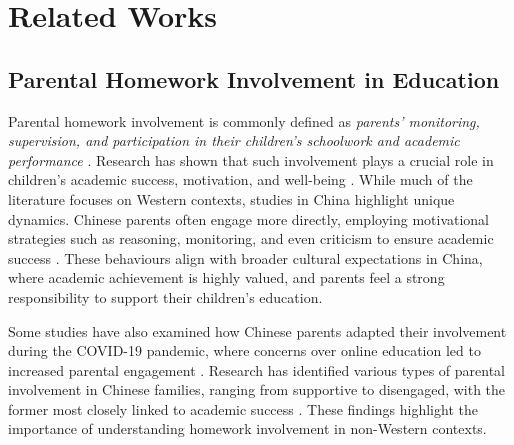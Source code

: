 \section{Related Works}

\subsection{Parental Homework Involvement in Education}

Parental homework involvement is commonly defined as \textit{parents' monitoring, supervision, and participation in their children's schoolwork and academic performance} \cite{pomerantz2007whom}. Research has shown that such involvement plays a crucial role in children's academic success, motivation, and well-being \cite{patall2008parent, dettmers2019antecedents, cooper1989synthesis}. While much of the literature focuses on Western contexts, studies in China highlight unique dynamics. Chinese parents often engage more directly, employing motivational strategies such as reasoning, monitoring, and even criticism to ensure academic success \cite{kim2013parents}. These behaviours align with broader cultural expectations in China, where academic achievement is highly valued, and parents feel a strong responsibility to support their children's education.

Some studies have also examined how Chinese parents adapted their involvement during the COVID-19 pandemic, where concerns over online education led to increased parental engagement \cite{wang2021parental}. Research has identified various types of parental involvement in Chinese families, ranging from supportive to disengaged, with the former most closely linked to academic success \cite{gan2019parental}. %
These findings highlight the importance of understanding homework involvement in non-Western contexts.%

